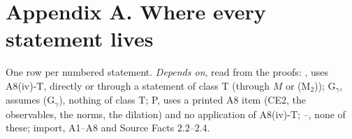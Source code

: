 \section*{Appendix A. Where every statement lives}

One row per numbered statement. \emph{Depends on}, read from the proofs:
, uses A8(iv)-T, directly or through a statement of class T (through $M$ or
(M$_2$)); G$_\gamma$, assumes (G$_\gamma$), nothing of class T; P, uses a printed A8 item
(CE2, the observables, the norms, the dilation) and no application of A8(iv)-T; --, none of these;
import, A1--A8 and Source Facts 2.2--2.4.


